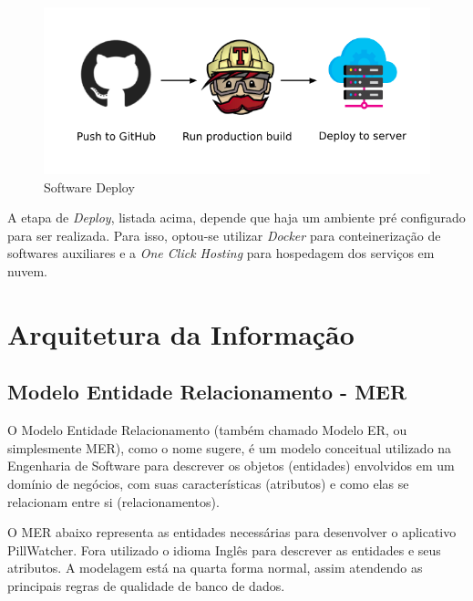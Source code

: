 \begin{figure}[H]
    \centering
    \includegraphics[width=1.0\textwidth]{figuras/deploy-continuous.png}
    \caption{Software Deploy}
    \label{fig:software_deploy}
\end{figure}

A etapa de \emph{Deploy}, listada acima, depende que haja um ambiente pré configurado para ser realizada. Para isso, optou-se utilizar \textit{Docker} para conteinerização de softwares auxiliares e a \textit{One Click Hosting} para hospedagem dos serviços em nuvem.

\section{Arquitetura da Informação}

\subsection{Modelo Entidade Relacionamento - MER}

O Modelo Entidade Relacionamento (também chamado Modelo ER, ou simplesmente MER), como o nome sugere, é um modelo conceitual utilizado na Engenharia de Software para descrever os objetos (entidades) envolvidos em um domínio de negócios, com suas características (atributos) e como elas se relacionam entre si (relacionamentos).\cite{DEVMEDIA_2014}

O MER abaixo representa as entidades necessárias para desenvolver o aplicativo PillWatcher. Fora utilizado o idioma Inglês para descrever as entidades e seus atributos. A modelagem está na quarta forma normal, assim atendendo as principais regras de qualidade de banco de dados.

